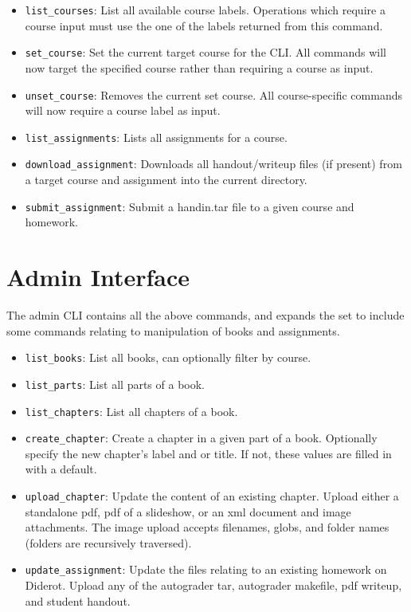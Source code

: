 \begin{itemize}
  \item \verb|list_courses|: List all available course labels.
    Operations which require a course input must use the one of the labels returned from this command.
  \item \verb|set_course|: Set the current target course for the CLI. All commands will now target the  specified course rather than requiring a course as input.
  \item \verb|unset_course|: Removes the current set course. All course-specific commands
    will now require a course label as input.
  \item \verb|list_assignments|: Lists all assignments for a course.
  \item \verb|download_assignment|: Downloads all handout/writeup files (if present) from a
    target course and assignment into the current directory.
  \item \verb|submit_assignment|: Submit a handin.tar file to a given course and homework.
\end{itemize}


\section{Admin Interface}

The admin CLI contains all the above commands, and expands the set to include
some commands relating to manipulation of books and assignments.

\begin{itemize}
  \item \verb|list_books|: List all books, can optionally filter by course.
  \item \verb|list_parts|: List all parts of a book.
  \item \verb|list_chapters|: List all chapters of a book.
  \item \verb|create_chapter|: Create a chapter in a given part of a
    book. Optionally specify the new chapter's label and or title. If
    not, these values are filled in with a default.

  \item \verb|upload_chapter|: Update the content of an existing
    chapter. Upload either a standalone pdf, pdf of a slideshow, or an
    xml document and image attachments.  The image upload accepts
    filenames, globs, and folder names (folders are recursively
    traversed).
  \item \verb|update_assignment|: Update the files relating to an existing homework on Diderot.  Upload any of the autograder tar, autograder makefile, pdf writeup, and student handout.
\end{itemize}



